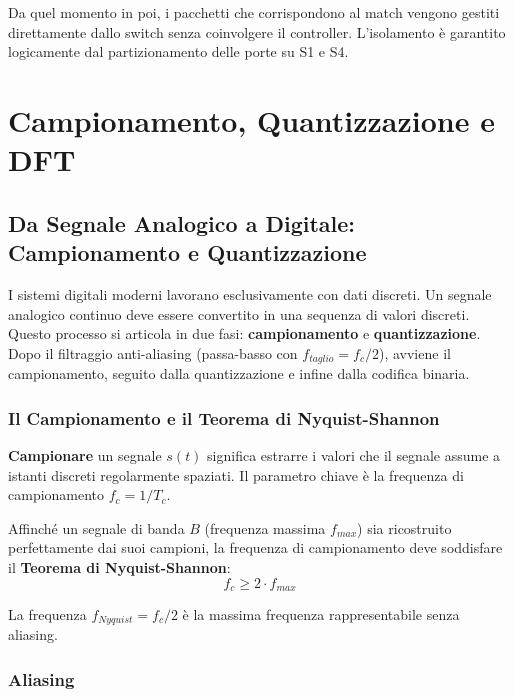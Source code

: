 \documentclass[
  italian,
  openany]{book}
\begin{document}
Da quel momento in poi, i pacchetti che corrispondono al match vengono
gestiti direttamente dallo switch senza coinvolgere il controller.
L'isolamento è garantito logicamente dal partizionamento delle porte su
S1 e S4.

\newpage

\chapter{Campionamento, Quantizzazione e
DFT}\label{campionamento-quantizzazione-e-dft}

\section{Da Segnale Analogico a Digitale: Campionamento e
Quantizzazione}\label{da-segnale-analogico-a-digitale-campionamento-e-quantizzazione}

I sistemi digitali moderni lavorano esclusivamente con dati discreti. Un
segnale analogico continuo deve essere convertito in una sequenza di
valori discreti. Questo processo si articola in due fasi:
\textbf{campionamento} e \textbf{quantizzazione}. Dopo il filtraggio
anti-aliasing (passa-basso con \(f_{taglio} = f_c/2\)), avviene il
campionamento, seguito dalla quantizzazione e infine dalla codifica
binaria.

\subsection{Il Campionamento e il Teorema di
Nyquist-Shannon}\label{il-campionamento-e-il-teorema-di-nyquist-shannon}

\textbf{Campionare} un segnale \(s(t)\) significa estrarre i valori che
il segnale assume a istanti discreti regolarmente spaziati. Il parametro
chiave è la frequenza di campionamento \(f_c = 1/T_c\).

Affinché un segnale di banda \(B\) (frequenza massima \(f_{max}\)) sia
ricostruito perfettamente dai suoi campioni, la frequenza di
campionamento deve soddisfare il \textbf{Teorema di Nyquist-Shannon}:
\[f_c \geq 2 \cdot f_{max}\]

La frequenza \(f_{Nyquist} = f_c/2\) è la massima frequenza
rappresentabile senza aliasing.

\subsection{Aliasing}\label{aliasing}
\end{document}
